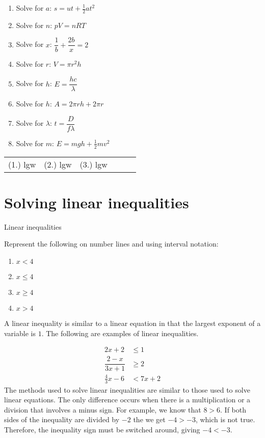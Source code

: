 \begin{exercises}{}
{
\begin{enumerate}[itemsep=5pt, label=\textbf{\arabic*}. ] 
\item Solve for $a$: $s=ut+\frac{1}{2}at^{2}$
\item Solve for $n$: $pV=nRT$ 
\item Solve for $x$: $\dfrac{1}{b}+\dfrac{2b}{x}=2$
\item Solve for $r$: $V = \pi r^{2} h$
\item Solve for $h$: $E=\dfrac{hc}{\lambda}$
\item Solve for $h$: $A=2\pi rh + 2 \pi r$
\item Solve for $\lambda$: $t=\dfrac{D}{f \lambda}$
\item Solve for $m$: $E=mgh + \frac{1}{2}mv^{2}$
\end{enumerate}
\practiceinfo
\par 
\par \begin{tabular}[h]{cccccc}
(1.) lgw  &  (2.) lgw  &  (3.) lgw  & \end{tabular}
}
\end{exercises}

\section{Solving linear inequalities}
\nopagebreak
\begin{activity}{Linear inequalities}
{
Represent the following on number lines and using interval notation:
\begin{enumerate}[noitemsep, label=\textbf{\arabic*}. ] 
\item $x<4$
\item $x\leq 4$
\item $x\geq 4$
\item $x>4$
\end{enumerate}
}
\end{activity}
A linear inequality is similar to a linear equation in that the largest exponent of a variable is $1$. The following are examples of linear inequalities.\par 

\begin{align*}
  2x+2 &\leq 1 \\
  \dfrac{2-x}{3x+1} &\geq 2 \\
  \frac{4}{3}x-6 &< 7x+2
\end{align*}
The methods used to solve linear inequalities are similar to those used to
solve linear equations. The only difference occurs when there is a
multiplication or a division that involves a minus sign. For example, we know
that $8>6$. If both sides of the inequality are divided by $-2$ the we get $-4 > -3$, which is not true. Therefore, the inequality sign must be switched around, giving
$-4<-3$.\par

